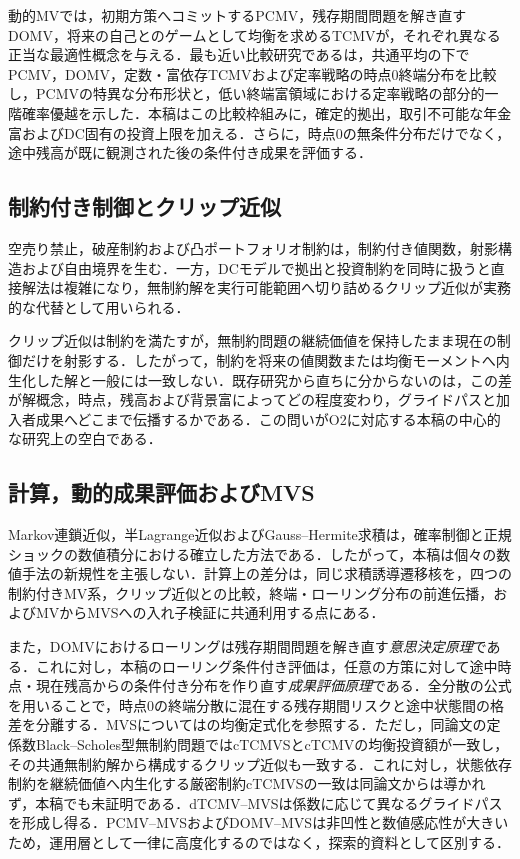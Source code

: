 \documentclass[10pt,a4paper]{article}
\theoremstyle{plain}
\theoremstyle{definition}
\begin{document}
動的MVでは，初期方策へコミットするPCMV\citep{LiNg2000,ZhouLi2000}，残存期間問題を解き直すDOMV\citep{PedersenPeskir2017,MenoncinVigna2020}，将来の自己とのゲームとして均衡を求めるTCMV\citep{BasakChabakauri2010,BjorkMurgoci2014,BjorkKhapkoMurgoci2017}が，それぞれ異なる正当な最適性概念を与える．最も近い比較研究である\citet{vanStadenDangForsyth2021}は，共通平均の下でPCMV，DOMV，定数・富依存TCMVおよび定率戦略の時点0終端分布を比較し，PCMVの特異な分布形状と，低い終端富領域における定率戦略の部分的一階確率優越を示した．本稿はこの比較枠組みに，確定的拠出，取引不可能な年金富およびDC固有の投資上限を加える．さらに，時点0の無条件分布だけでなく，途中残高が既に観測された後の条件付き成果を評価する．

\subsection{制約付き制御とクリップ近似}

空売り禁止，破産制約および凸ポートフォリオ制約は，制約付き値関数，射影構造および自由境界を生む\citep{LiZhouLim2002,LiXu2015,BensoussanWongYamYung2014,GuanLiZhouZhou2022}．一方，DCモデルで拠出と投資制約を同時に扱うと直接解法は複雑になり，無制約解を実行可能範囲へ切り詰めるクリップ近似が実務的な代替として用いられる\citep{DiGiacintoFedericoGozziVigna2014,FerreiraMoriciVigna2025}．

クリップ近似は制約を満たすが，無制約問題の継続価値を保持したまま現在の制御だけを射影する．したがって，制約を将来の値関数または均衡モーメントへ内生化した解と一般には一致しない．既存研究から直ちに分からないのは，この差が解概念，時点，残高および背景富によってどの程度変わり，グライドパスと加入者成果へどこまで伝播するかである．この問いがO2に対応する本稿の中心的な研究上の空白である．

\subsection{計算，動的成果評価およびMVS}

Markov連鎖近似，半Lagrange近似およびGauss--Hermite求積は，確率制御と正規ショックの数値積分における確立した方法である\citep{KushnerDupuis2001,FalconeFerretti2014,AbramowitzStegun1972,Judd1998}．したがって，本稿は個々の数値手法の新規性を主張しない．計算上の差分は，同じ求積誘導遷移核を，四つの制約付きMV系，クリップ近似との比較，終端・ローリング分布の前進伝播，およびMVからMVSへの入れ子検証に共通利用する点にある．

また，DOMVにおけるローリングは残存期間問題を解き直す\emph{意思決定原理}である．これに対し，本稿のローリング条件付き評価は，任意の方策に対して途中時点・現在残高からの条件付き分布を作り直す\emph{成果評価原理}である．全分散の公式を用いることで，時点0の終端分散に混在する残存期間リスクと途中状態間の格差を分離する．MVSについては\citet{MuTianYang2019}の均衡定式化を参照する．ただし，同論文の定係数Black--Scholes型無制約問題ではcTCMVSとcTCMVの均衡投資額が一致し，その共通無制約解から構成するクリップ近似も一致する．これに対し，状態依存制約を継続価値へ内生化する厳密制約cTCMVSの一致は同論文からは導かれず，本稿でも未証明である．dTCMV--MVSは係数に応じて異なるグライドパスを形成し得る．PCMV--MVSおよびDOMV--MVSは非凹性と数値感応性が大きいため，運用層として一律に高度化するのではなく，探索的資料として区別する．
\end{document}

